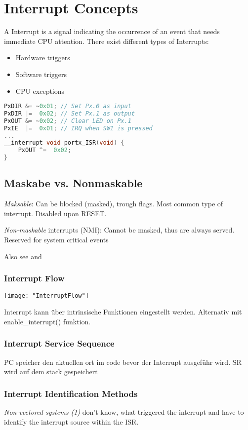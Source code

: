 \section{Interrupt Concepts }
A Interrupt is a signal indicating the occurrence of an event that needs immediate CPU attention.
There exist different types of Interrupts:
\begin{itemize}
	\itemsep-.5em 
	\item Hardware triggers
	\item Software triggers
	\item CPU exceptions
\end{itemize}

\begin{lstlisting}[language=c]
PxDIR &= ~0x01;	// Set Px.0 as input
PxDIR |=  0x02;	// Set Px.1 as output
PxOUT &= ~0x02;	// Clear LED on Px.1
PxIE  |=  0x01;	// IRQ when SW1 is pressed
...
__interrupt void portx_ISR(void) {
	PxOUT ^=  0x02;
}
\end{lstlisting}\vspace{-25px}

\subsection{Maskabe vs. Nonmaskable }
\textit{Maksable}: Can be blocked (masked), trough flags. Most common type of interrupt. Disabled upon RESET.

\textit{Non-maskable} interrupts (NMI): Cannot be masked, thus are always served. Reserved for system critical events

Also see  and 


\subsubsection{Interrupt Flow}
\texttt{[image: "InterruptFlow"]}

Interrupt kann über intrinsische Funktionen eingestellt werden.
Alternativ mit enable\_interrupt() funktion.


\subsubsection{Interrupt Service Sequence }
PC speicher den aktuellen ort im code bevor der Interrupt ausgeführ wird.
SR wird auf dem stack gespeichert

\subsubsection{Interrupt Identification Methods }
\textit{Non-vectored systems (1)} don't know, what triggered the interrupt and have to identify the interrupt source within the ISR.

